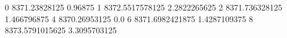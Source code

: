 0 8371.23828125 0.96875
1 8372.5517578125 2.2822265625
2 8371.736328125 1.466796875
4 8370.26953125 0.0
6 8371.6982421875 1.4287109375
8 8373.5791015625 3.3095703125
